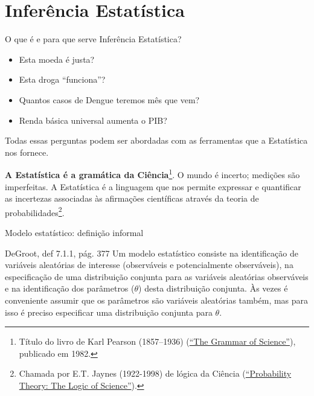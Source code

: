 \section*{Inferência Estatística}
\begin{frame}{O que é e para que serve Inferência Estatística?}

\begin{itemize}
 \item[\faQuestion] Esta moeda é justa?
 \item[\faQuestion] Esta droga ``funciona''?
 \item[\faQuestion] Quantos casos de Dengue teremos mês que vem?
 \item[\faQuestion] Renda básica universal aumenta o PIB?
\end{itemize}

Todas essas perguntas podem ser abordadas com as ferramentas que a Estatística nos fornece.

\begin{ideia}
\label{idea:statistics_grammar_science}
\textbf{A Estatística é a gramática da Ciência}\footnote{Título do livro de Karl Pearson (1857--1936) (\href{https://en.wikipedia.org/wiki/The_Grammar_of_Science}{``The Grammar of Science''}), publicado em 1982.}.
O mundo é incerto; medições são imperfeitas.
A Estatística é a linguagem que nos permite expressar e quantificar as incertezas associadas às afirmações científicas através da teoria de probabilidades\footnote{Chamada por E.T. Jaynes (1922-1998) de lógica da Ciência (\href{https://www.cambridge.org/gb/academic/subjects/physics/theoretical-physics-and-mathematical-physics/probability-theory-logic-science}{``Probability Theory: The Logic of Science''}).}.
\end{ideia}
\end{frame}
\begin{frame}{Modelo estatístico: definição informal}
\begin{defn}
\label{def:statistical_model_informal}
DeGroot, def 7.1.1, pág. 377
Um modelo estatístico consiste na identificação de variáveis aleatórias de interesse (observáveis e potencialmente observáveis), na especificação de uma distribuição conjunta para as variáveis aleatórias observáveis e na identificação dos parâmetros ($\theta$) desta distribuição conjunta.
Às vezes é conveniente assumir que os parâmetros são variáveis aleatórias também, mas para isso é preciso especificar uma distribuição conjunta para $\theta$.
\end{defn}
 
\end{frame}
